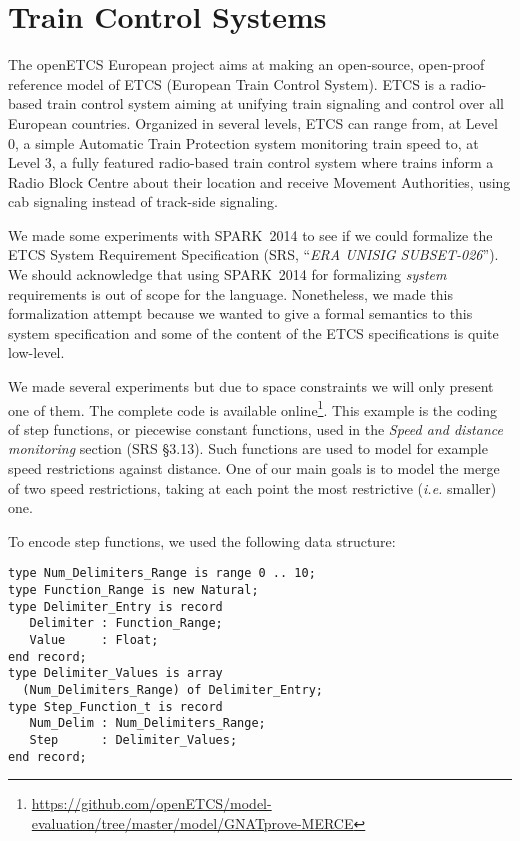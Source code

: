 \documentclass[10pt,a4paper,twocolumn]{article}
\newcommand{\openetcs}{openETCS\xspace}
\newcommand{\newspark}{SPARK~2014\xspace}
\newcommand{\ie}{\textit{i.e.}\xspace}
\begin{document}
\section{Train Control Systems}
\label{sec:openETCS}



The \openetcs European project aims at making an open-source,
open-proof reference model of ETCS (European Train Control
System). ETCS is a radio-based train control system aiming at unifying
train signaling and control over all European countries. Organized in
several levels, ETCS can range from, at Level 0, a simple Automatic
Train Protection system monitoring train speed to, at Level 3, a fully
featured radio-based train control system where trains inform a Radio
Block Centre about their location and receive Movement Authorities,
using cab signaling instead of track-side signaling.

We made some experiments with \newspark to see if we could formalize
the ETCS System Requirement Specification (SRS, ``\emph{ERA UNISIG
  SUBSET-026}''). We should acknowledge that using \newspark for
formalizing \emph{system} requirements is out of scope for the
language. Nonetheless, we made this formalization attempt because we
wanted to give a formal semantics to this system specification and
some of the content of the ETCS specifications is quite low-level.


We made several experiments but due to space constraints we will only
present one of them. The complete code is available
online\footnote{\url{https://github.com/openETCS/model-evaluation/tree/master/model/GNATprove-MERCE}}.
This example is the coding of step functions, or piecewise constant
functions, used in the \textit{Speed and distance monitoring} section
(SRS §3.13). Such functions are used to model for example speed
restrictions against distance. One of our main goals is to model the
merge of two speed restrictions, taking at each point the most
restrictive (\ie smaller) one.

To encode step functions, we used the following data structure:
\begin{lstlisting}
type Num_Delimiters_Range is range 0 .. 10;
type Function_Range is new Natural;
type Delimiter_Entry is record
   Delimiter : Function_Range;
   Value     : Float;
end record;
type Delimiter_Values is array
  (Num_Delimiters_Range) of Delimiter_Entry;
type Step_Function_t is record
   Num_Delim : Num_Delimiters_Range;
   Step      : Delimiter_Values;
end record;
\end{lstlisting}
\end{document}
